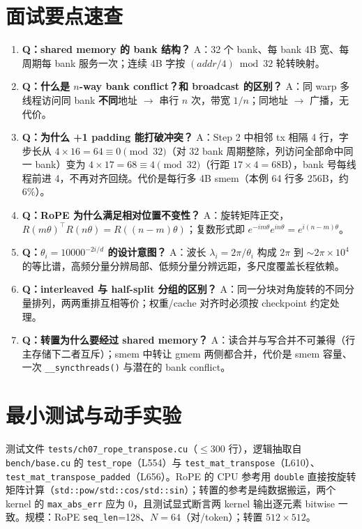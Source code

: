 \section{面试要点速查}

\begin{enumerate}
  \item \textbf{Q：shared memory 的 bank 结构？} A：32 个 bank、每 bank 4B 宽、每周期每 bank 服务一次；连续 4B 字按 $(addr/4) \bmod 32$ 轮转映射。
  \item \textbf{Q：什么是 $n$-way bank conflict？和 broadcast 的区别？} A：同 warp 多线程访问同 bank \textbf{不同}地址 $\to$ 串行 $n$ 次，带宽 $1/n$；同地址 $\to$ 广播，无代价。
  \item \textbf{Q：为什么 +1 padding 能打破冲突？} A：Step 2 中相邻 tx 相隔 4 行，字步长从 $4 \times 16 = 64 \equiv 0 \pmod{32}$（对 32 bank 周期整除，列访问全部命中同一 bank）变为 $4 \times 17 = 68 \equiv 4 \pmod{32}$（行距 $17 \times 4 = 68\mathrm{B}$），bank 号每线程前进 4，不再对齐回绕。代价是每行多 4B smem（本例 64 行多 256B，约 $6\%$）。
  \item \textbf{Q：RoPE 为什么满足相对位置不变性？} A：旋转矩阵正交，$R(m\theta)^{\top}R(n\theta) = R((n-m)\theta)$；复数形式即 $e^{-im\theta}e^{in\theta} = e^{i(n-m)\theta}$。
  \item \textbf{Q：$\theta_i = 10000^{-2i/d}$ 的设计意图？} A：波长 $\lambda_i = 2\pi/\theta_i$ 构成 $2\pi$ 到 $\sim 2\pi \times 10^4$ 的等比谱，高频分量分辨局部、低频分量分辨远距，多尺度覆盖长程依赖。
  \item \textbf{Q：interleaved 与 half-split 分组的区别？} A：同一分块对角旋转的不同分量排列，两两重排互相等价；权重/cache 对齐时必须按 checkpoint 约定处理。
  \item \textbf{Q：转置为什么要经过 shared memory？} A：读合并与写合并不可兼得（行主存储下二者互斥）；smem 中转让 gmem 两侧都合并，代价是 smem 容量、一次 \texttt{\_\allowbreak{}\_\allowbreak{}syncthreads\allowbreak{}()} 与潜在的 bank conflict。
\end{enumerate}

\section{最小测试与动手实验}

测试文件 \texttt{tests/\allowbreak{}ch07\_\allowbreak{}rope\_\allowbreak{}transpose.\allowbreak{}cu}（$\le 300$ 行），逻辑抽取自 \texttt{bench/base.cu} 的 \texttt{test\_rope}（L554）与 \texttt{test\_\allowbreak{}mat\_\allowbreak{}transpose}（L610）、\texttt{test\_\allowbreak{}mat\_\allowbreak{}transpose\_\allowbreak{}padded}（L656）。RoPE 的 CPU 参考用 \texttt{double} 直接按旋转矩阵计算（\texttt{std::\allowbreak{}pow/\allowbreak{}std::\allowbreak{}cos/\allowbreak{}std::\allowbreak{}sin}）；转置的参考是纯数据搬运，两个 kernel 的 \texttt{max\_abs\_err} 应为 0，且测试显式断言两 kernel 输出逐元素 bitwise 一致。规模：RoPE \texttt{seq\_len}=128、$N=64$（对/token）；转置 $512 \times 512$。

